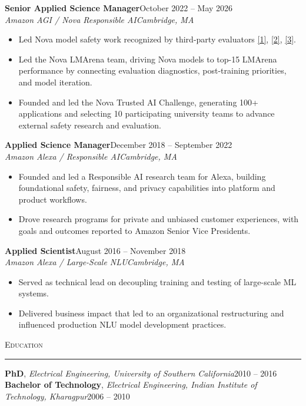 \documentclass[11pt]{article}
\newcommand{\sectionheading}[1]{%
  \vspace{8pt}%
  {\large\scshape #1}\par\vspace{1pt}\hrule\vspace{3pt}%
}
\newcommand{\resumeentry}[5]{%
  \textbf{#1}\hfill #2\\
  \textit{#3}\hfill \textit{#4}
  \begin{itemize}
    #5
  \end{itemize}
  \vspace{2pt}
}
\begin{document}
\resumeentry
  {Senior Applied Science Manager}
  {October 2022 -- May 2026}
  {Amazon AGI / Nova Responsible AI}
  {Cambridge, MA}
  {\item Led Nova model safety work recognized by third-party evaluators \href{https://www.openpr.com/news/3785920/anthropic-amazon-lead-the-way-in-ai-safety-for-frontier-models}{[1]}, \href{https://medium.com/aymara-ai/the-aymara-llm-risk-responsibility-matrix-5a243fcf7e38}{[2]}, \href{https://www.amazon.science/blog/independent-evaluations-demonstrate-nova-premiers-safety}{[3]}.
   \item Led the Nova LMArena team, driving Nova models to top-15 LMArena performance by connecting evaluation diagnostics, post-training priorities, and model iteration.
   \item Founded and led the Nova Trusted AI Challenge, generating 100+ applications and selecting 10 participating university teams to advance external safety research and evaluation.}

\resumeentry
  {Applied Science Manager}
  {December 2018 -- September 2022}
  {Amazon Alexa / Responsible AI}
  {Cambridge, MA}
  {\item Founded and led a Responsible AI research team for Alexa, building foundational safety, fairness, and privacy capabilities into platform and product workflows.
   \item Drove research programs for private and unbiased customer experiences, with goals and outcomes reported to Amazon Senior Vice Presidents.}

\resumeentry
  {Applied Scientist}
  {August 2016 -- November 2018}
  {Amazon Alexa / Large-Scale NLU}
  {Cambridge, MA}
  {\item Served as technical lead on decoupling training and testing of large-scale ML systems.
   \item Delivered business impact that led to an organizational restructuring and influenced production NLU model development practices.}

\sectionheading{Education}

\textbf{PhD}, \textit{Electrical Engineering, University of Southern California}\hfill 2010 -- 2016\\
\textbf{Bachelor of Technology}, \textit{Electrical Engineering, Indian Institute of Technology, Kharagpur}\hfill 2006 -- 2010
\end{document}
